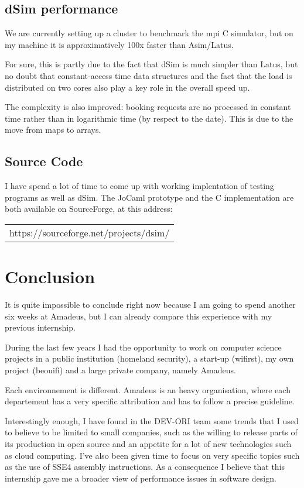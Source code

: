 \documentclass[11pt]{JHEP3}
\begin{document}
\subsection{dSim performance}

We are currently setting up a cluster to benchmark the mpi C
simulator, but on my machine it is approximatively 100x faster than
Asim/Latus.

For sure, this is partly due to the fact that dSim is much simpler
than Latus, but no doubt that constant-access time data structures and
the fact that the load is distributed on two cores also play a key
role in the overall speed up.



The complexity is also improved: booking requests are no processed in
constant time rather than in logarithmic time (by respect to the
date). This is due to the move from maps to arrays.



\subsection{Source Code}

I have spend a lot of time to come up with working implentation of
testing programs as well as dSim. The JoCaml prototype and the C
implementation are both available on SourceForge, at this address:

\begin{tabular}{c}
https://sourceforge.net/projects/dsim/
\end{tabular}

\newpage
\section{Conclusion}

It is quite impossible to conclude right now because I am going to
spend another six weeks at Amadeus, but I can already compare this
experience with my previous internship.

During the last few years I had the opportunity to work on computer
science projects in a public institution (homeland security), a
start-up (wifirst), my own project (beouifi) and a large private
company, namely Amadeus.

Each environnement is different. Amadeus is an heavy organisation,
where each departement has a very specific attribution and has to
follow a precise guideline.

Interestingly enough, I have found in the DEV-ORI team some trends that
I used to believe to be limited to small companies, such as the
willing to release parts of its production in open source and an
appetite for a lot of new technologies such as cloud computing. I've
also been given time to focus on very specific topics such as the use
of SSE4 assembly instructions. As a consequence I believe that this
internship gave me a broader view of performance issues in software
design.
\end{document}

